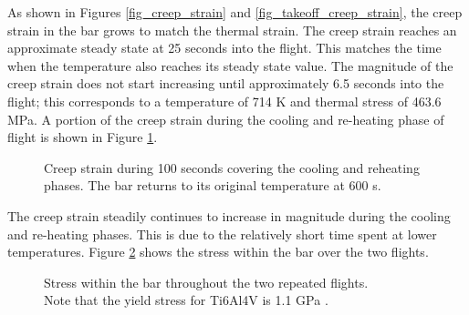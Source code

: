 \documentclass[conf]{new-aiaa}
\begin{document}
As shown in Figures \ref{fig_creep_strain}
and \ref{fig_takeoff_creep_strain}, the creep strain in the bar 
grows to match the thermal strain. 
The creep strain reaches an approximate steady state 
at 25 seconds into the flight. 
This matches the time when the temperature also reaches
its steady state value.
The magnitude of the creep strain does not start increasing
until approximately 6.5 seconds into the flight;
this corresponds to a temperature of 714 K
and thermal stress of 463.6 MPa.
A portion of the creep strain during the cooling and re-heating
phase of flight is shown in Figure \ref{fig_touchdown_creep_strain}.

\begin{figure}[H]
  \centering
  \caption{ Creep strain during 100 seconds covering the cooling and reheating phases.
            The bar returns to its original temperature at 600 s.}
  \label{fig_touchdown_creep_strain}
\end{figure}

The creep strain steadily continues to increase in magnitude 
during the cooling and re-heating phases.
This is due to the relatively short time spent at lower
temperatures.
Figure \ref{fig_full_bar_stress} shows
the stress within the bar over the two flights.


\begin{figure}[H]
  \centering
  \caption{ Stress within the bar throughout the two repeated flights. \\
            Note that the yield stress for Ti6Al4V is 1.1 GPa 
            \cite{boyer_materials_properties_handbook_titanium_alloys}. }
  \label{fig_full_bar_stress}
\end{figure}
\end{document}
